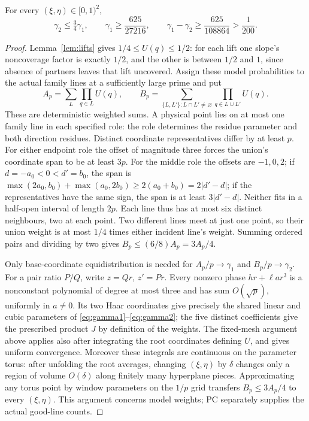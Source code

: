 \begin{theorem}\label{thm:weakmargin}
For every $(\xi,\eta)\in[0,1)^2$,
\[
 \gamma_2\le\tfrac34\gamma_1,\qquad
 \gamma_1\ge\frac{625}{27216},\qquad
 \gamma_1-\gamma_2\ge\frac{625}{108864}>\frac1{200}.
\]
\end{theorem}
\begin{proof}
Lemma~\ref{lem:lifts} gives $1/4\le U(q)\le1/2$: for each lift one slope's noncoverage factor is exactly $1/2$,
and the other is between $1/2$ and $1$, since absence of partners leaves that lift uncovered.
Assign these model probabilities to the actual family lines at a sufficiently large prime and put
\[
 A_p=\sum_L\prod_{q\in L}U(q),\qquad
 B_p=\sum_{\{L,L'\}:L\cap L'\ne\varnothing}\prod_{q\in L\cup L'}U(q).
\]
These are deterministic weighted sums.  A physical point lies on at most one family line in each specified role:
the role determines the residue parameter and both direction residues.  Distinct coordinate representatives differ by at least $p$.
For either endpoint role the offset of magnitude three forces the union's coordinate span to be at least $3p$.
For the middle role the offsets are $-1,0,2$; if $d=-a_0<0<d'=b_0$, the span is
$\max(2a_0,b_0)+\max(a_0,2b_0)\ge2(a_0+b_0)=2|d'-d|$;
if the representatives have the same sign, the span is at least $3|d'-d|$.
Neither fits in a half-open interval of length $2p$.
Each line thus has at most six distinct neighbours, two at each point.  Two different lines meet at just one point,
so their union weight is at most $1/4$ times either incident line's weight.  Summing ordered pairs and dividing by two gives
$B_p\le(6/8)A_p=3A_p/4$.

Only base-coordinate equidistribution is needed for $A_p/p\to\gamma_1$ and $B_p/p\to\gamma_2$.
For a pair ratio $P/Q$, write $z=Qr$, $z'=Pr$.  Every nonzero phase $hr+\ell ar^3$ is a nonconstant polynomial
of degree at most three and has sum $O(\sqrt p)$, uniformly in $a\ne0$.
Its two Haar coordinates give precisely the shared linear and cubic parameters of \eqref{eq:gamma1}--\eqref{eq:gamma2};
the five distinct coefficients give the prescribed product $J$ by definition of the weights.
The fixed-mesh argument above applies also after integrating the root coordinates defining $U$, and gives uniform convergence.
Moreover these integrals are continuous on the parameter torus: after unfolding the root averages, changing $(\xi,\eta)$
by $\delta$ changes only a region of volume $O(\delta)$ along finitely many hyperplane pieces.
Approximating any torus point by window parameters on the $1/p$ grid transfers $B_p\le3A_p/4$ to every $(\xi,\eta)$.
This argument concerns model weights; PC separately supplies the actual good-line counts.


\end{proof}
